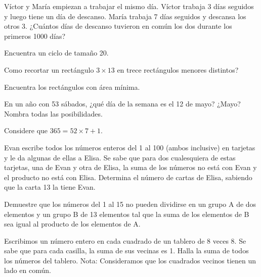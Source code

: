 \documentclass[11pt]{scrartcl}
\begin{document}
\begin{problem}
    Víctor y María empiezan a trabajar el mismo día. Víctor trabaja 3 días seguidos y luego tiene un día de descanso. María trabaja 7 días seguidos y descansa los otros 3. ¿Cuántos días de descanso tuvieron en común los dos durante los primeros 1000 días?
    \begin{hint}
        Encuentra un ciclo de tamaño 20.
    \end{hint}
\end{problem}

\begin{problem}
    Como recortar un rectángulo \(3 \times 13\) en trece rectángulos menores distintos?
    \begin{hint}
Encuentra los rectángulos con área mínima.
    \end{hint}
\end{problem}

\begin{problem}
En un año con 53 sábados, ¿qué día de la semana es el 12 de mayo? ¿Mayo? Nombra todas las posibilidades.
    \begin{hint}
        Considere que \(365=52\times 7+1\).
    \end{hint}
\end{problem}

\begin{problem}[Bulgaria]
    Evan escribe todos los números enteros del 1 al 100 (ambos inclusive) en tarjetas y le da algunas de ellas a Elisa. Se sabe que para dos cualesquiera de estas tarjetas, una de Evan y otra de Elisa, la suma de los números no está con Evan y el producto no está con Elisa. Determina el número de cartas de Elisa, sabiendo que la carta 13 la tiene Evan.
\end{problem}

\begin{problem}[Rusia]
Demuestre que los números del 1 al 15 no pueden dividirse en un grupo A de dos elementos y un grupo B de 13 elementos tal que la suma de los elementos de B sea igual al producto de los elementos de A.
\end{problem}

\begin{problem}
Escribimos un número entero en cada cuadrado de un tablero de 8 veces 8. Se sabe que para cada casilla, la suma de sus vecinas es 1. Halla la suma de todos los números del tablero.
Nota: Consideramos que los cuadrados vecinos tienen un lado en común.
\end{problem}
\end{document}

